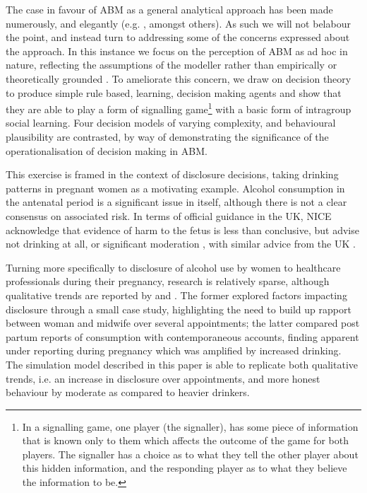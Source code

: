 \documentclass[graybox]{svmult}
\begin{document}
The case in favour of \ac{ABM} as a general analytical approach has been made numerously, and elegantly (e.g. \cite{epstein1994growing,Resnick,Axelrod1997,gilbert1999simulation,Macy2002a,Silverman2011,Silverman2013,epstein2014agent_zero}, amongst others). As such we will not belabour the point, and instead turn to addressing some of the concerns expressed about the approach. In this instance we focus on the perception of \ac{ABM} as ad hoc in nature, reflecting the assumptions of the modeller rather than empirically or theoretically grounded \citep{Waldherr2013}. To ameliorate this concern, we draw on decision theory to produce simple rule based, learning, decision making agents and show that they are able to play a form of signalling game\footnote{In a signalling game, one player (the signaller), has some piece of information that is known only to them which affects the outcome of the game for both players. The signaller has a choice as to what they tell the other player about this hidden information, and the responding player as to what they believe the information to be.} \citep{Kreps1987} with a basic form of intragroup social learning. Four decision models of varying complexity, and behavioural plausibility are contrasted, by way of demonstrating the significance of the operationalisation of decision making in \ac{ABM}.

This exercise is framed in the context of disclosure decisions, taking drinking patterns in pregnant women as a motivating example. Alcohol consumption in the antenatal period is a significant issue in itself, although there is not a clear consensus on associated risk. In terms of official guidance in the UK, \ac{NICE} acknowledge that evidence of harm to the fetus is less than conclusive, but advise not drinking at all, or significant moderation \citep{NICE2010a}, with similar advice from the UK \cite{DepartmentofHealth2008}.

Turning more specifically to disclosure of alcohol use by women to healthcare professionals during their pregnancy, research is relatively sparse, although qualitative trends are reported by \citet{Phillips2007} and \citet{Alvik2006}. The former explored factors impacting disclosure through a small case study, highlighting the need to build up rapport between woman and midwife over several appointments; the latter compared post partum reports of consumption with contemporaneous accounts, finding apparent under reporting during pregnancy which was amplified by increased drinking. The simulation model described in this paper is able to replicate both qualitative trends, i.e. an increase in disclosure over appointments, and more honest behaviour by moderate as compared to heavier drinkers.
\end{document}
